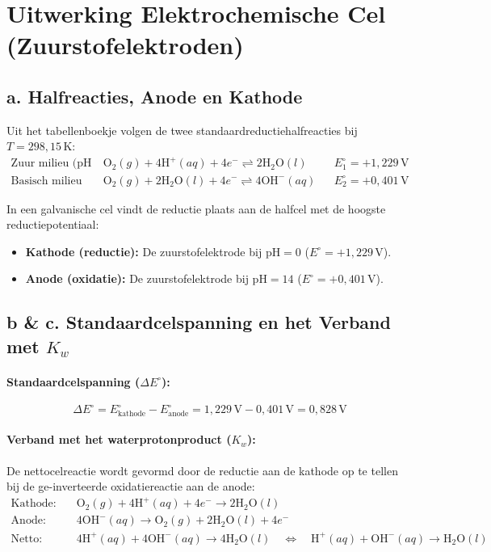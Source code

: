 \documentclass[11pt]{article}
\begin{document}
\section*{Uitwerking Elektrochemische Cel (Zuurstofelektroden)}

\subsection*{a. Halfreacties, Anode en Kathode}
Uit het tabellenboekje volgen de twee standaardreductiehalfreacties bij $T = 298{,}15\,\text{K}$:
\begin{align*}
\text{Zuur milieu (pH 0):} \quad & \text{O}_2(g) + 4\text{H}^+(aq) + 4e^- \rightleftharpoons 2\text{H}_2\text{O}(l) && E^\circ_1 = +1{,}229\,\text{V} \\
\text{Basisch milieu (pH 14):} \quad & \text{O}_2(g) + 2\text{H}_2\text{O}(l) + 4e^- \rightleftharpoons 4\text{OH}^-(aq) && E^\circ_2 = +0{,}401\,\text{V}
\end{align*}

In een galvanische cel vindt de reductie plaats aan de halfcel met de hoogste reductiepotentiaal:
\begin{itemize}
    \item \textbf{Kathode (reductie):} De zuurstofelektrode bij $\text{pH} = 0$ ($E^\circ = +1{,}229\,\text{V}$).
    \item \textbf{Anode (oxidatie):} De zuurstofelektrode bij $\text{pH} = 14$ ($E^\circ = +0{,}401\,\text{V}$).
\end{itemize}

\subsection*{b \& c. Standaardcelspanning en het Verband met $K_w$}

\paragraph{Standaardcelspanning ($\Delta E^\circ$):}
\begin{equation*}
\Delta E^\circ = E^\circ_{\text{kathode}} - E^\circ_{\text{anode}} = 1{,}229\,\text{V} - 0{,}401\,\text{V} = 0{,}828\,\text{V}
\end{equation*}

\paragraph{Verband met het waterprotonproduct ($K_w$):}
De nettocelreactie wordt gevormd door de reductie aan de kathode op te tellen bij de ge-inverteerde oxidatiereactie aan de anode:
\begin{align*}
\text{Kathode:} \quad & \text{O}_2(g) + 4\text{H}^+(aq) + 4e^- \rightarrow 2\text{H}_2\text{O}(l) \\
\text{Anode:} \quad & 4\text{OH}^-(aq) \rightarrow \text{O}_2(g) + 2\text{H}_2\text{O}(l) + 4e^- \\
\hline
\text{Netto:} \quad & 4\text{H}^+(aq) + 4\text{OH}^-(aq) \rightarrow 4\text{H}_2\text{O}(l) \quad \iff \quad \text{H}^+(aq) + \text{OH}^-(aq) \rightarrow \text{H}_2\text{O}(l)
\end{align*}
\end{document}
